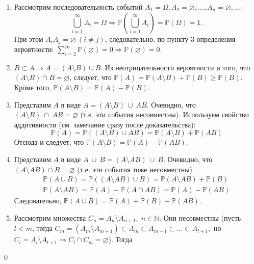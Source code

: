 \documentclass[oneside,final,14pt]{extreport}
\newcommand\myprob[1]{{\mathbb{P}(#1)}}
\renewenvironment{proof}{{\bfseries Доказательство.}}{\qed}
\theoremstyle{plain}
\theoremstyle{definition}
\theoremstyle{named}
\begin{document}
\begin{proof}\leavevmode
    \begin{enumerate}
    \item Рассмотрим последовательность событий $A_{1} = \Omega, A_{2} = \varnothing, \ldots, A_{n} = \varnothing, \ldots$:
    \begin{equation*}
        \bigcup\limits_{i=1}^\infty A_i = \Omega \Rightarrow \myprob{\bigcup\limits_{i=1}^\infty A_i} = \myprob{\Omega} = 1.
    \end{equation*}
    При этом $A_{i}A_j = \varnothing~(i \ne j)$, следовательно, по пункту 3 определения вероятности: $\sum\limits_{i=2}^\infty \myprob{\varnothing} = 0 \Rightarrow \myprob{\varnothing} = 0$.
    \item $B \subset A \Rightarrow A = (A \setminus B) \cup B$. Из неотрицательности вероятности и того, что $(A \setminus B) \cap B = \varnothing$, следует, что $\myprob{A} = \myprob{A \setminus B} + \myprob{B} \geqslant \myprob{B}$. Кроме того, $\myprob{A \setminus B} = \myprob{A} - \myprob{B}$.
    \item Представим $A$ в виде $A = (A \setminus B) \: \cup \: AB$. Очевидно, что \\ $(A \setminus B) \: \cap \: AB = \varnothing$ (т.е. эти события несовместны). Используем свойство аддитивности (см. замечание сразу после доказательства): 
    \begin{equation*}
        \myprob{A} = \myprob{(A \setminus B) \cup AB} = \myprob{A \setminus B} + \myprob{AB}
    \end{equation*}
    Отсюда и следует, что $\myprob{A \setminus B} = \myprob{A} - \myprob{AB}.$
    \item Представим $A$ в виде $A \: \cup \: B = (A \setminus AB)\: \cup \:B$. Очевидно, что \\ $(A \setminus AB) \cap B = \varnothing$ (т.е. эти события тоже несовместны).
    \begin{gather*}
        \myprob{A \cup B} = \myprob{(A \setminus AB) \cup B} = \myprob{A \setminus AB} + \myprob{B} \\
        \myprob{A \setminus AB} = \myprob{A} - \myprob{A \cap AB} = \myprob{A} - \myprob{AB}
    \end{gather*}
    Следовательно, $\myprob{A \cup B} = \myprob{A} + \myprob{B} - \myprob{AB}$.
    \item Рассмотрим множества $C_n = A_n \setminus A_{n+1}, \; n \in \mathbb{N}$. Они несовместны (пусть $l < m$, тогда $C_m = (A_m \setminus A_{m+1}) \subset A_m \subset A_{m-1} \subset \ldots \subset A_{l+1},$ но $C_l = A_l \setminus A_{l+1} \Rightarrow C_l \cap C_m = \varnothing$). Тогда

\end{enumerate}
\end{proof}
\end{document}
